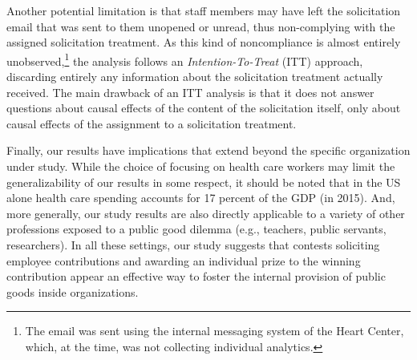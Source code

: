 \documentclass[12pt, titlepage]{article}
\begin{document}
Another potential limitation is that staff members may have left the
solicitation email that was sent to them unopened or unread, thus
non-complying with the assigned solicitation treatment. As this kind of
noncompliance is almost entirely unobserved,\footnote{The email was sent
  using the internal messaging system of the Heart Center, which, at the
  time, was not collecting individual analytics.} the analysis follows
an \emph{Intention-To-Treat} (ITT) approach, discarding entirely any
information about the solicitation treatment actually received. The main
drawback of an ITT analysis is that it does not answer questions about
causal effects of the content of the solicitation itself, only about
causal effects of the assignment to a solicitation treatment.

Finally, our results have implications that extend beyond the specific
organization under study. While the choice of focusing on health care
workers may limit the generalizability of our results in some respect,
it should be noted that in the US alone health care spending accounts
for 17 percent of the GDP (in 2015). And, more generally, our study
results are also directly applicable to a variety of other professions
exposed to a public good dilemma (e.g., teachers, public servants,
researchers). In all these settings, our study suggests that contests
soliciting employee contributions and awarding an individual prize to
the winning contribution appear an effective way to foster the internal
provision of public goods inside organizations.

\renewcommand\refname{References}

\end{document}
